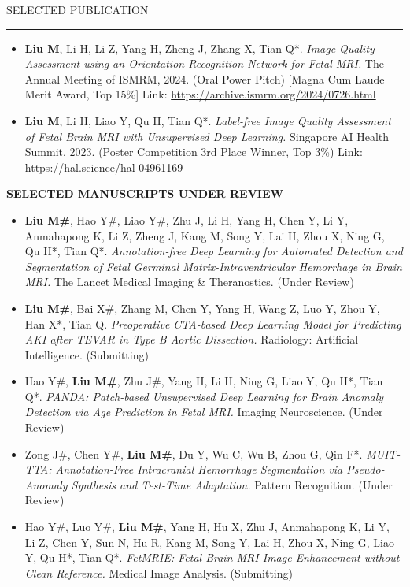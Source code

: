 \documentclass{resume} %
\renewenvironment{rSection}[1]{
\sectionskip
\textcolor{TsinghuaPurple}{\MakeUppercase{#1}}
\sectionlineskip
\hrule
\begin{list}{}{
\setlength{\leftmargin}{0em}
}
\item[]
}{
\end{list}
}
\begin{document}
\begin{rSection}{Selected Publication}
\begin{itemize}
\item \textbf{Liu M}, Li H, Li Z, Yang H, Zheng J, Zhang X, Tian Q*. \textit{Image Quality Assessment using an Orientation Recognition Network for Fetal MRI.} The Annual Meeting of ISMRM, 2024. (Oral Power Pitch) [Magna Cum Laude Merit Award, Top 15\%] Link: \url{https://archive.ismrm.org/2024/0726.html}

\item \textbf{Liu M}, Li H, Liao Y, Qu H, Tian Q*. \textit{Label-free Image Quality Assessment of Fetal Brain MRI with Unsupervised Deep Learning.} Singapore AI Health Summit, 2023. (Poster Competition 3rd Place Winner, Top 3\%) Link: \url{https://hal.science/hal-04961169}
\end{itemize}

\textbf{SELECTED MANUSCRIPTS UNDER REVIEW}

\begin{itemize}
    \item \textbf{Liu M\#}, Hao Y\#, Liao Y\#, Zhu J, Li H, Yang H, Chen Y, Li Y, Anmahapong K, Li Z, Zheng J, Kang M, Song Y, Lai H, Zhou X, Ning G, Qu H*, Tian Q*. \textit{Annotation-free Deep Learning for Automated Detection and Segmentation of Fetal Germinal Matrix-Intraventricular Hemorrhage in Brain MRI.} The Lancet Medical Imaging \& Theranostics. (Under Review)

    \item \textbf{Liu M\#}, Bai X\#, Zhang M, Chen Y, Yang H, Wang Z, Luo Y, Zhou Y, Han X*, Tian Q. \textit{Preoperative CTA-based Deep Learning Model for Predicting AKI after TEVAR in Type B Aortic Dissection.} Radiology: Artificial Intelligence. (Submitting)

    \item Hao Y\#, \textbf{Liu M\#}, Zhu J\#, Yang H, Li H, Ning G, Liao Y, Qu H*, Tian Q*. \textit{PANDA: Patch-based Unsupervised Deep Learning for Brain Anomaly Detection via Age Prediction in Fetal MRI.} Imaging Neuroscience. (Under Review)

    \item Zong J\#, Chen Y\#, \textbf{Liu M\#}, Du Y, Wu C, Wu B, Zhou G, Qin F*. \textit{MUIT-TTA: Annotation-Free Intracranial Hemorrhage Segmentation via Pseudo-Anomaly Synthesis and Test-Time Adaptation.} Pattern Recognition. (Under Review)

    \item Hao Y\#, Luo Y\#, \textbf{Liu M\#}, Yang H, Hu X, Zhu J, Anmahapong K, Li Y, Li Z, Chen Y, Sun N, Hu R, Kang M, Song Y, Lai H, Zhou X, Ning G, Liao Y, Qu H*, Tian Q*. \textit{FetMRIE: Fetal Brain MRI Image Enhancement without Clean Reference.} Medical Image Analysis. (Submitting)


\end{itemize}
\end{rSection}
\end{document}
